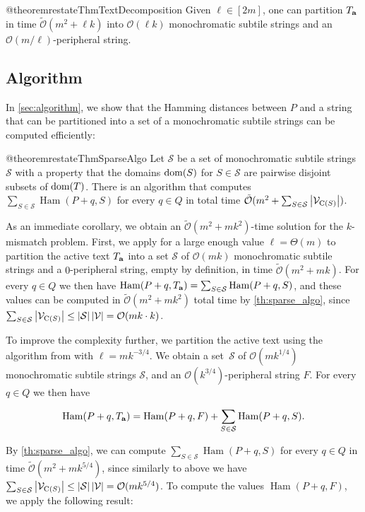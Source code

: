 \documentclass[twoside,leqno]{article}
\renewcommand{\O}{\mathcal{O}}
\newcommand{\tO}{\tilde{\mathcal{O}}}
\renewcommand{\S}{\mathcal{S}}
\newcommand{\V}{\mathcal{V}}
\DeclareMathOperator*{\Ham}{Ham}
\newcommand{\absolute}[1]{\left\lvert#1\right\rvert}
\begin{document}
\begin{restatable*}{@theorem}{restateThmTextDecomposition}\label{text_decomposition}
Given $\ell \in [2m]$, one can partition $T_\mathbf{a}$ in time $\tO(m^2 + \ell k)$ into $\O(\ell k)$ monochromatic subtile strings and an $\O(m / \ell)$-peripheral string.
\end{restatable*}

\subsection{Algorithm}
In \cref{sec:algorithm}, we show that the Hamming distances between $P$ and a string that can be partitioned into a set of a monochromatic subtile strings can be computed efficiently: 

\begin{restatable*}{@theorem}{restateThmSparseAlgo}
\label{th:sparse_algo}
Let $\S$ be a set of monochromatic subtile strings $\S$ with a property that the domains $\operatorname*{dom}(S)$ for $S \in \S$ are pairwise disjoint subsets of $\operatorname*{dom}(T)$. There is an algorithm that computes
$\sum_{S \in \S} \Ham(P + q, S)$ for every $q \in Q$ in total time $\tO(m^2 + \sum_{S \in \S} \absolute{\V_{\getchar{S}}})$.
\end{restatable*}

As an immediate corollary, we obtain an $\tO(m^2 + mk^2)$-time solution for the $k$-mismatch problem. First, we apply  for a large enough value $\ell = \Theta(m)$ to partition the active text $T_\mathbf{a}$ into a set $\S$ of $\O(mk)$ monochromatic subtile strings and a $0$-peripheral string, empty by definition, in time $\tO(m^2 + mk)$. For every $q \in Q$ we then have $\Ham(P + q, \Ta) = \sum_{S \in \S} \Ham(P + q, S)$, and these values can be computed in $\tO(m^2 + mk^{2})$ total time by \cref{th:sparse_algo}, since $\sum_{S \in \S} \absolute{\V_{\getchar{S}}} \le \absolute{\S} \absolute{\V} = \O(mk \cdot k)$. 

To improve the complexity further, we partition the active text using the algorithm from  with $\ell = mk^{-3/4}$.
We obtain a set~$\S$ of $\O(mk^{1/4})$ monochromatic subtile strings $\S$, and an $\O(k^{3 / 4})$-peripheral string $F$. For every $q \in Q$ we then have

\[ \Ham(P + q, \Ta) = \Ham(P + q, F) + \sum_{S \in \S} \Ham(P + q, S).\]

By \cref{th:sparse_algo}, we can compute $\sum_{S \in \S} \Ham(P + q, S)$ for every $q \in Q$ in time $\tO(m^2 + mk^{5/4})$, since similarly to above we have $\sum_{S \in \S} \absolute{\V_{\getchar{S}}} \le \absolute{\S} \absolute{\V} = \O(mk^{5/4})$. To compute the values $\Ham(P + q, F)$, we apply the following result:
\end{document}
